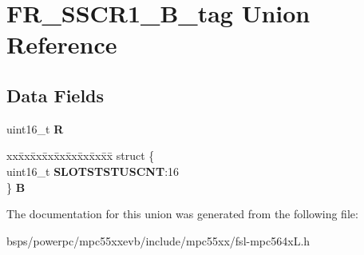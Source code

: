 \hypertarget{unionFR__SSCR1__16B__tag}{}\section{F\+R\+\_\+\+S\+S\+C\+R1\+\_\+B\+\_\+tag Union Reference}
\label{unionFR__SSCR1__16B__tag}
\subsection*{Data Fields}
\begin{DoxyCompactItemize}
\item 
\mbox{\label{unionFR__SSCR1__16B__tag_a6828a5b2c80a7fba16dee168bc15f8c9}} 
uint16\+\_\+t {\bfseries R}
\item 
\mbox{\label{unionFR__SSCR1__16B__tag_a16b67d08faba4651932e7ea51c773e6b}} 
\begin{tabbing}
xx\=xx\=xx\=xx\=xx\=xx\=xx\=xx\=xx\=\kill
struct \{\\
\>uint16\_t {\bfseries SLOTSTSTUSCNT}:16\\
\} {\bfseries B}\\

\end{tabbing}\end{DoxyCompactItemize}


The documentation for this union was generated from the following file\+:\begin{DoxyCompactItemize}
\item 
bsps/powerpc/mpc55xxevb/include/mpc55xx/fsl-\/mpc564x\+L.\+h\end{DoxyCompactItemize}
